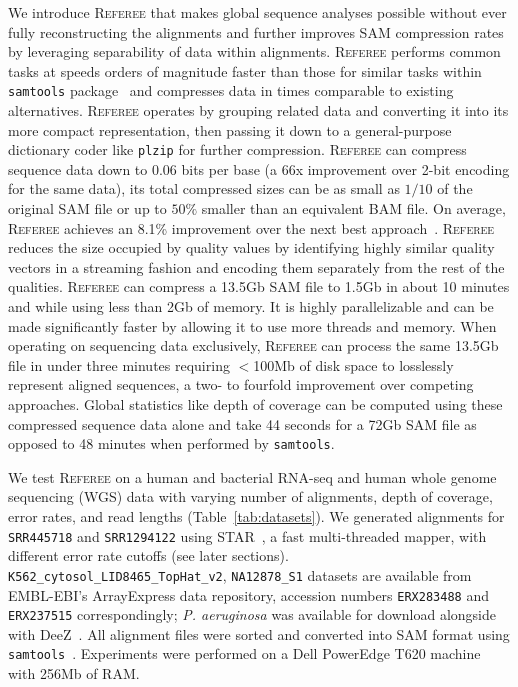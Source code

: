 \documentclass[12pt]{cmuthesis}
\newcommand{\refer}{\textsc{Referee}\xspace}
\begin{document}
  We introduce \refer that makes global sequence analyses possible without ever fully reconstructing the alignments and further improves SAM compression rates by leveraging separability of data within alignments. \refer performs common tasks at speeds orders of magnitude faster than those for similar tasks within \texttt{samtools} package~\cite{SamTools} and compresses data in times comparable to existing alternatives. \refer operates by grouping related data and converting it into its more compact representation, then passing it down to a general-purpose dictionary coder like \texttt{plzip} for further compression. \refer can compress sequence data down to 0.06 bits per base (a 66x improvement over 2-bit encoding for the same data), its total compressed sizes can be as small as $1/10$ of the original SAM file or up to $50\%$ smaller than an equivalent BAM file. On average, \refer achieves an 8.1\% improvement over the next best approach~\cite{Sahinalp2015}. \refer reduces the size occupied by quality values by identifying highly similar quality vectors in a streaming fashion and encoding them separately from the rest of the qualities. \refer can compress a 13.5Gb SAM file to 1.5Gb in about 10 minutes and while using less than 2Gb of memory. It is highly parallelizable and can be made significantly faster by allowing it to use more threads and memory. When operating on sequencing data exclusively, \refer can process the same 13.5Gb file in under three minutes requiring $<$100Mb of disk space to losslessly represent aligned sequences, a two- to fourfold improvement over competing approaches. Global statistics like depth of coverage can be computed using these compressed sequence data alone and take 44 seconds for a 72Gb SAM file as opposed to 48 minutes when performed by \texttt{samtools}.



  We test \refer on a human and bacterial RNA-seq and human whole genome sequencing (WGS) data with varying number of alignments, depth of coverage, error rates, and read lengths (Table~\ref{tab:datasets}). We generated alignments for \texttt{SRR445718} and \texttt{SRR1294122} using STAR~\cite{DobinSTAR}, a fast multi-threaded mapper, with different error rate cutoffs (see later sections).
  \texttt{K562\_cytosol\_LID8465\_TopHat\_v2}, \texttt{NA12878\_S1} datasets are available from EMBL-EBI's ArrayExpress data repository, accession numbers \texttt{ERX283488} and \texttt{ERX237515} correspondingly;
  \textit{P. aeruginosa} was available for download alongside with DeeZ~\cite{Sahinalp2015}. All alignment files were sorted and converted into SAM format using \texttt{samtools}~\cite{SamTools}. Experiments were performed on a Dell PowerEdge T620 machine with 256Mb of RAM.
\end{document}
